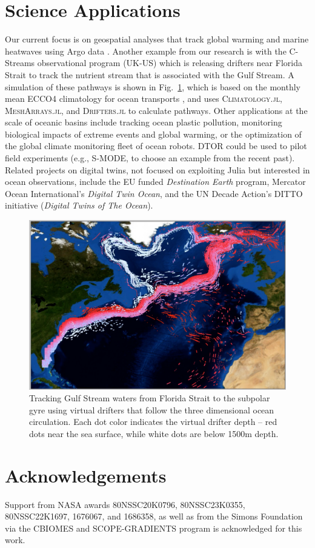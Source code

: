 \documentclass{juliacon}[12pt]
\newcommand{\pkg}[1]{{\small \textsc{#1}}}
\begin{document}
\section{Science Applications}

Our current focus is on geospatial analyses that track global warming and marine heatwaves using Argo data \cite{Forget2024a}. Another example from our research is with the C-Streams observational program (UK-US) which is releasing drifters near Florida Strait to track the nutrient stream that is associated with the Gulf Stream. A simulation of these pathways is shown in Fig.~\ref{fig:Cstream}, which is based on the monthly mean ECCO4 climatology for ocean transports \cite{Forget2015a,Forget2019,Rousselet2021}, and uses \pkg{Climatology.jl}, \pkg{MeshArrays.jl}, and \pkg{Drifters.jl} to calculate pathways. Other applications at the scale of oceanic basins include tracking ocean plastic pollution, monitoring biological impacts of extreme events and global warming, or the optimization of the global climate monitoring fleet of ocean robots. DTOR could be used to pilot field experiments (e.g., S-MODE, to choose an example from the recent past). Related projects on digital twins, not focused on exploiting Julia but interested in ocean observations, include the EU funded {\it Destination Earth} program, Mercator Ocean International's {\it Digital Twin Ocean}, and the UN Decade Action's DITTO initiative ({\it Digital Twins of The Ocean}).

\begin{figure}[hb] 
\includegraphics[width=\columnwidth]{figs/GulfStream_21_27_snapshot.png}
\caption{Tracking Gulf Stream waters from Florida Strait to the subpolar gyre using virtual drifters that follow the three dimensional ocean circulation. Each dot color indicates the virtual drifter depth -- red dots near the sea surface, while white dots are below 1500m depth.}
\label{fig:Cstream}
\end{figure} 

\section{Acknowledgements}

Support from NASA awards 80NSSC20K0796, 80NSSC23K0355, 80NSSC22K1697, 1676067, and 1686358, as well as from the Simons Foundation via the CBIOMES and SCOPE-GRADIENTS program is acknowledged for this work.


\end{document}
